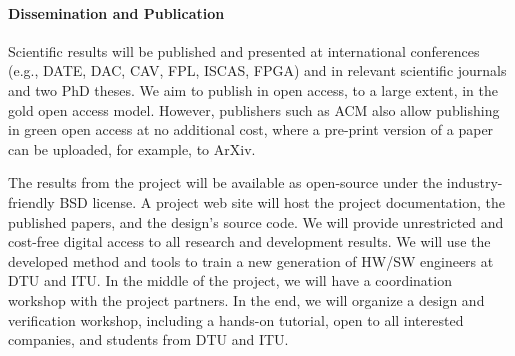 \documentclass[fleqn,12pt]{article}
\begin{document}





\paragraph*{Dissemination and Publication}

Scientific results will be published and presented at international
conferences (e.g., DATE, DAC, CAV, FPL, ISCAS, FPGA) and in relevant scientific journals
and two PhD theses.
We aim to publish in open access, to a large extent, in the gold open access model.
However, publishers such as ACM also allow publishing in green open access
at no additional cost, where a pre-print version of a paper can be uploaded,
for example, to ArXiv.

The results from the project will be available as open-source under the
industry-friendly BSD license.
A project web site will host the project documentation, the published papers, and the design's source code.
We will provide unrestricted and cost-free digital access to all research and development results.
%
We will use the developed method and tools to train a new generation of HW/SW engineers
at DTU and ITU.
In the middle of the project, we will have a coordination workshop with the project partners.
In the end, we will organize a design and verification workshop, including a hands-on tutorial,
open to all interested companies, and students from DTU and ITU.
\end{document}
